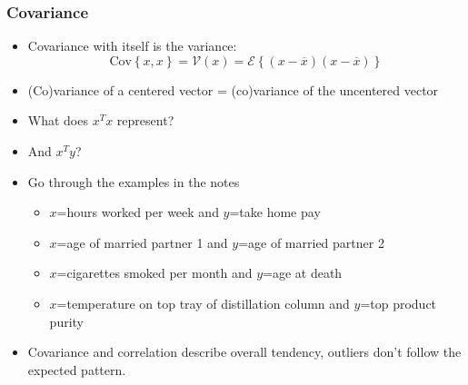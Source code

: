 \begin{frame}\frametitle{Covariance}
	\begin{itemize}
		\item	Covariance with itself is the variance:
		$$\text{Cov}\left\{x, x\right\} = \mathcal{V}(x) = \mathcal{E}\left\{ (x - \overline{x}) (x - \overline{x})\right\}$$

		\item	(Co)variance of a centered vector = (co)variance of the uncentered vector
		\item	What does $x^Tx$ represent?
		\item	And $x^Ty$?
	\end{itemize}
	\begin{itemize}
		\item	Go through the examples in the notes
		\begin{itemize}
			\item	$x$=hours worked per week and $y$=take home pay
			\item	$x$=age of married partner 1 and $y$=age of married partner 2
			\item	$x$=cigarettes smoked per month and $y$=age at death
			\item	$x$=temperature on top tray of distillation column and $y$=top product purity
		\end{itemize}
	\end{itemize}
	\begin{itemize}
		\item	Covariance and correlation describe overall tendency, outliers don't follow the expected pattern.
	\end{itemize}
\end{frame}

